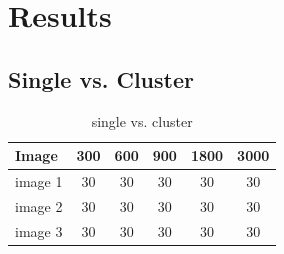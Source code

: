 \chapter{Results}




\section{Single vs. Cluster}
\begin{table}[h]
\caption{single vs. cluster}
\centering
\begin{tabular}{l c c c c c}
\hline\hline
Image & 300 & 600 & 900 & 1800 & 3000 \\
\hline
image 1 & 30 & 30 & 30 & 30 & 30 \\
image 2 & 30 & 30 & 30 & 30 & 30 \\
image 3 & 30 & 30 & 30 & 30 & 30 \\
\hline
\end{tabular}
\end{table}

